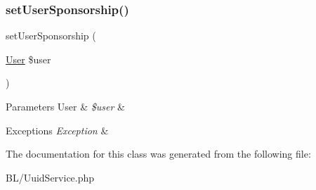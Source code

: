 \subsubsection{\texorpdfstring{setUserSponsorship()}{setUserSponsorship()}}
{\footnotesize\ttfamily set\+User\+Sponsorship (\begin{DoxyParamCaption}\item[{\mbox{\hyperlink{class_app_1_1_entity_1_1_user}{User}}}]{\$user }\end{DoxyParamCaption})}


\begin{DoxyParams}[1]{Parameters}
User & {\em \$user} & \\
\hline
\end{DoxyParams}

\begin{DoxyExceptions}{Exceptions}
{\em Exception} & \\
\hline
\end{DoxyExceptions}


The documentation for this class was generated from the following file\+:\begin{DoxyCompactItemize}
\item 
B\+L/Uuid\+Service.\+php\end{DoxyCompactItemize}
